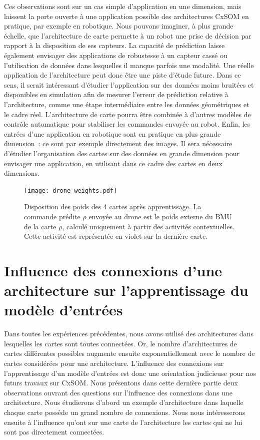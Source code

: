 \documentclass[../main]{subfiles}
\begin{document}
Ces observations sont sur un cas simple d'application en une dimension, mais laissent la porte ouverte à une application possible des architectures CxSOM en pratique, par exemple en robotique. 
Nous pouvons imaginer, à plus grande échelle, que l'architecture de carte permette à un robot une prise de décision par rapport à la disposition de ses capteurs. La capacité de prédiction laisse également envisager des applications de robustesse à un capteur cassé ou l'utilisation de données dans lesquelles il manque parfois une modalité.
Une réelle application de l'architecture peut donc être une piste d'étude future.
Dans ce sens, il serait intéressant d'étudier l'application sur des données moins bruitées et disponibles en simulation afin de mesurer l'erreur de prédiction relative à l'architecture, comme une étape intermédiaire entre les données géométriques et le cadre réel. 
L'architecture de carte pourra être combinée à d'autres modèles de contrôle automatique pour stabiliser les commandes envoyée au robot.
Enfin, les entrées d'une application en robotique sont en pratique en plus grande dimension~: ce sont par exemple directement des images. Il sera nécessaire d'étudier l'organisation des cartes sur des données en grande dimension pour envisager une application, en utilisant dans ce cadre des cartes en deux dimensions.

\begin{figure}
\texttt{[image: drone\_weights.pdf]}
\caption{Disposition des poids des 4 cartes après apprentissage. La commande prédite $\rho$ envoyée au drone est le poids externe du BMU de la carte $\rho$, calculé uniquement à partir des activités contextuelles. Cette activité est représentée en violet sur la dernière carte.}
\label{fig:drone_w}
\end{figure}

\section{Influence des connexions d'une architecture sur l'apprentissage du modèle d'entrées}

Dans toutes les expériences précédentes, nous avons utilisé des architectures dans lesquelles les cartes sont toutes connectées. Or, le nombre d'architectures de cartes différentes possibles augmente ensuite exponentiellement avec le nombre de cartes considérées pour une architecture.
L'influence des connexions sur l'apprentissage d'un modèle d'entrées est donc une orientation judicieuse pour nos futurs travaux sur CxSOM. 
Nous présentons dans cette dernière partie deux observations ouvrant des questions sur l'influence des connexions dans une architecture.
Nous étudierons d'abord un exemple d'architecture dans laquelle chaque carte possède un grand nombre de connexions.
Nous nous intéresserons ensuite à l'influence qu'ont sur une carte de l'architecture les cartes qui ne lui sont pas directement connectées.
\end{document}
